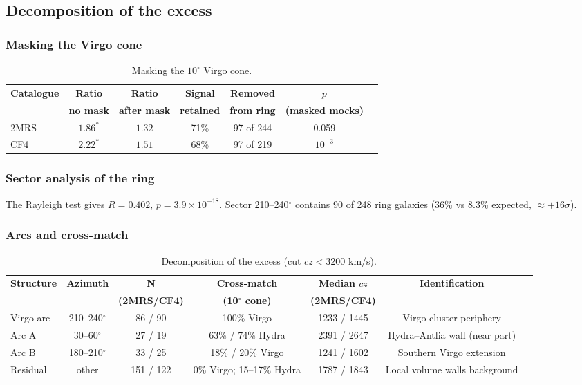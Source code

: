 \documentclass[11pt,a4paper]{article}
\begin{document}
\subsection{Decomposition of the excess}
\subsubsection{Masking the Virgo cone}
\begin{table}[H]
\centering
\caption{Masking the \(10^\circ\) Virgo cone.}
\begin{tabular}{lcccccc}
\toprule
\textbf{Catalogue} & \textbf{Ratio} & \textbf{Ratio} & \textbf{Signal} & \textbf{Removed} & \textbf{\(p\)} \\
 & \textbf{no mask} & \textbf{after mask} & \textbf{retained} & \textbf{from ring} & \textbf{(masked mocks)} \\
\midrule
2MRS & \(1.86^*\) & \(1.32\) & 71\% & 97 of 244 & 0.059 \\
CF4  & \(2.22^*\) & \(1.51\) & 68\% & 97 of 219 & \(10^{-3}\) \\
\bottomrule
\end{tabular}
\end{table}

\subsubsection{Sector analysis of the ring}
The Rayleigh test gives \(R = 0.402\), \(p = 3.9 \times 10^{-18}\). Sector 210--240\(^\circ\) contains 90 of 248 ring galaxies (36\% vs 8.3\% expected, \(\approx +16\sigma\)).

\subsubsection{Arcs and cross-match}
\begin{table}[H]
\centering
\caption{Decomposition of the excess (cut \(cz < 3200\) km/s).}
\begin{adjustbox}{max width=\textwidth}
\begin{tabular}{lcccccc}
\toprule
\textbf{Structure} & \textbf{Azimuth} & \textbf{N} & \textbf{Cross-match} & \textbf{Median \(cz\)} & \textbf{Identification} \\
 & & \textbf{(2MRS/CF4)} & \textbf{(10\(^\circ\) cone)} & \textbf{(2MRS/CF4)} & \\
\midrule
Virgo arc & 210--240\(^\circ\) & 86 / 90 & 100\% Virgo & 1233 / 1445 & Virgo cluster periphery \\
Arc A & 30--60\(^\circ\) & 27 / 19 & 63\% / 74\% Hydra & 2391 / 2647 & Hydra--Antlia wall (near part) \\
Arc B & 180--210\(^\circ\) & 33 / 25 & 18\% / 20\% Virgo & 1241 / 1602 & Southern Virgo extension \\
Residual & other & 151 / 122 & 0\% Virgo; 15--17\% Hydra & 1787 / 1843 & Local volume walls background \\
\bottomrule
\end{tabular}
\end{adjustbox}
\end{table}
\end{document}

